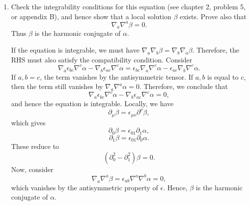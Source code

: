 \begin{enumerate}[label=\alph*)]
    \item Check the integrability conditions for this equation (see chapter 2,
    problem 5, or appendix B), and hence show that a local solution $\beta$
    exists. Prove also that
    \begin{equation}
        \nabla_a\nabla^a\beta=0.
    \end{equation}
    Thus $\beta$ is the harmonic conjugate of $\alpha$.
    \begin{solution}
        If the equation is integrable, we must have $\nabla_a\nabla_b\beta  = \nabla_b \nabla_a \beta$. Therefore, the RHS must also satisfy the compatibility condition. Consider
        \begin{equation}
            \nabla_a\epsilon_{bc}\nabla^c \alpha  - \nabla_b\epsilon_{ac}\nabla^c \alpha= \epsilon_{bc}\nabla_a\nabla^c \alpha - \epsilon_{ac}\nabla_b\nabla^c \alpha.
        \end{equation}
        If $a,b=c$, the term vanishes by the antisymmetric tensor. If  $a,b$ is equal to $c$, then the term still vanishes by $\nabla_a \nabla^a\alpha = 0$. Therefore, we conclude that
        \begin{equation}
             \nabla_a\epsilon_{bc}\nabla^c \alpha  - \nabla_b\epsilon_{ac}\nabla^c \alpha = 0,
        \end{equation}
        and hence the equation is integrable. Locally, we have
        \begin{equation}
            \partial_\mu \beta = \epsilon_{\mu\nu}\partial^\nu \beta,
        \end{equation}
        which gives
        \begin{equation}
            \partial_0\beta = \epsilon_{01}\partial_1 \alpha,
        \end{equation}
        \begin{equation}
            \partial_1 \beta = \epsilon_{01}\partial_0 \alpha.
        \end{equation}
        These reduce to
        \begin{equation}
            (\partial_0^2 - \partial_1^2) \beta = 0.
        \end{equation}
        Now, consider
        \begin{equation}
            \nabla_a\nabla^a \beta = \epsilon_{ab}\nabla^a\nabla^b \alpha = 0,
        \end{equation}
        which vanishes by the antisymmetric property of $\epsilon$. Hence, $\beta$ is the harmonic conjugate of $\alpha$.


\end{solution}
\end{enumerate}
